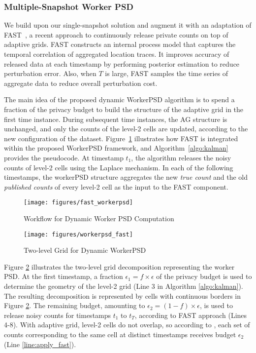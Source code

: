 \documentclass{USC-Thesis}
\numberwithin{equation}{chapter}
\begin{document}
\subsubsection{Multiple-Snapshot Worker PSD}

We build upon our single-snapshot solution and augment it with an adaptation of FAST~\cite{Fan14TKDE}, a recent approach to continuously release private counts on top of adaptive grids. 
FAST constructs an internal process model that captures the temporal correlation of aggregated location traces. It improves accuracy of released data at each timestamp by performing posterior estimation to reduce perturbation error.  Also, when $T$ is large, FAST samples the time series of aggregate data to reduce overall perturbation cost.

The main idea of the proposed dynamic WorkerPSD algorithm is to spend a fraction of the privacy budget to build the structure of the adaptive grid in the first time instance. During subsequent time instances, the AG structure is unchanged, and only the counts of the level-2 cells are updated, according to the new configuration of the dataset. 
Figure~\ref{fig:fast_workerpsd} illustrates how FAST is integrated within the proposed WorkerPSD framework, and Algorithm~\ref{algo:kalman} provides the pseudocode.
At timestamp $t_1$, the algorithm releases the noisy counts of level-2 cells using the Laplace mechanism. In each of the following timestamps, the workerPSD structure aggregates the new \emph{true count} and the old \emph{published counts} of every level-2 cell as the input to the FAST component.

\begin{figure}[!htb]\centering
  \texttt{[image: figures/fast\_workerpsd]}
  \caption{Workflow for Dynamic Worker PSD Computation}
  \label{fig:fast_workerpsd}
\end{figure}


\begin{figure}[!htb]\centering
  \texttt{[image: figures/workerpsd\_fast]}
  \caption{Two-level Grid for Dynamic WorkerPSD}
  \label{fig:workerpsd_fast}
\end{figure}

Figure \ref{fig:workerpsd_fast} illustrates the two-level grid decomposition representing the worker PSD. At the first timestamp, a fraction $\epsilon_1 = f \times \epsilon$ of the privacy budget is used to determine the geometry of the level-2 grid (Line 3 in Algorithm \ref{algo:kalman}). The resulting decomposition is represented by cells with continuous borders in Figure \ref{fig:workerpsd_fast}. The remaining budget, amounting to $\epsilon_2 = (1-f)\times \epsilon$, is used to release noisy counts for timestamps $t_1$ to $t_T$, according to FAST approach (Lines 4-8). With adaptive grid, level-2 cells do not overlap, so according to \cite{cormode2012differentially}, each set of counts corresponding to the same cell at distinct timestamps receives budget $\epsilon_2$ (Line \ref{line:apply_fast}).
\end{document}
